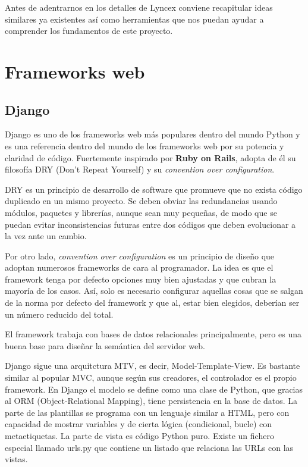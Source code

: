 \documentclass[openright,twoside,12pt]{book}
\begin{document}
Antes de adentrarnos en los detalles de Lyncex conviene recapitular ideas similares ya existentes así como herramientas que nos puedan ayudar a comprender los fundamentos de este proyecto.

\section{Frameworks web}

\subsection{Django}
Django es uno de los frameworks web más populares dentro del mundo Python y es una referencia dentro del mundo de los frameworks web por su potencia y claridad de código\cite{django}.
Fuertemente inspirado por \textbf{Ruby on Rails}, adopta de él su filosofía DRY (Don't Repeat Yourself) y su \textit{convention over configuration}.

DRY\cite{wiki:dry} es un principio de desarrollo de software que promueve que no exista código duplicado en un mismo proyecto. Se deben obviar las redundancias usando módulos, paquetes y librerías, aunque sean muy pequeñas, de modo que se puedan evitar inconsistencias futuras entre dos códigos que deben evolucionar a la vez ante un cambio.

Por otro lado, \textit{convention over configuration}\cite{wiki:coc} es un principio de diseño que adoptan numerosos frameworks de cara al programador. La idea es que el framework tenga por defecto opciones muy bien ajustadas y que cubran la mayoría de los casos. Así, solo es necesario configurar aquellas cosas que se salgan de la norma por defecto del framework y que al, estar bien elegidos, deberían ser un número reducido del total.

El framework trabaja con bases de datos relacionales principalmente, pero es una buena base para diseñar la semántica del servidor web.

Django sigue una arquitctura MTV, es decir, Model-Template-View. Es bastante similar al popular MVC, aunque según sus creadores, el controlador es el propio framework.
En Django el modelo se define como una clase de Python, que gracias al ORM (Object-Relational Mapping), tiene persistencia en la base de datos. La parte de las plantillas se programa con un lenguaje similar a HTML, pero con capacidad de mostrar variables
y de cierta lógica (condicional, bucle) con metaetiquetas. La parte de vista es código Python puro. Existe un fichero especial llamado urls.py que contiene un listado que relaciona las URLs con las vistas.
\end{document}
